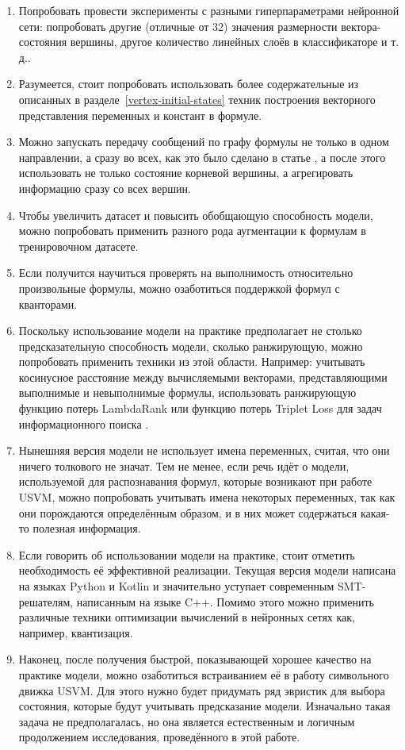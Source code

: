 \begin{enumerate}
    \item Попробовать провести эксперименты с разными гиперпараметрами нейронной сети: попробовать другие (отличные от 32) значения размерности вектора-состояния вершины, другое количество линейных слоёв в классификаторе и т. д..
    \item Разумеется, стоит попробовать использовать более содержательные из описанных в разделе~\ref{vertex-initial-states} техник построения векторного представления переменных и констант в формуле.
    \item Можно запускать передачу сообщений по графу формулы не только в одном направлении, а сразу во всех, как это было сделано в статье \cite{gnn-for-scheduling-paper}, а после этого использовать не только состояние корневой вершины, а агрегировать информацию сразу со всех вершин.
    \item Чтобы увеличить датасет и повысить обобщающую способность модели, можно попробовать применить разного рода аугментации к формулам в тренировочном датасете.
    \item Если получится научиться проверять на выполнимость относительно произвольные формулы, можно озаботиться поддержкой формул с кванторами.
    \item Поскольку использование модели на практике предполагает не столько предсказательную способность модели, сколько ранжирующую, можно попробовать применить техники из этой области. Например: учитывать косинусное расстояние между вычисляемыми векторами, представляющими выполнимые и невыполнимые формулы, использовать ранжирующую функцию потерь LambdaRank \cite{lambda-rank-paper} или функцию потерь Triplet Loss для задач информационного поиска \cite{triplet-loss-paper-1} \cite{triplet-loss-paper-2}.
    \item Нынешняя версия модели не использует имена переменных, считая, что они ничего толкового не значат. Тем не менее, если речь идёт о модели, используемой для распознавания формул, которые возникают при работе USVM, можно попробовать учитывать имена некоторых переменных, так как они порождаются определённым образом, и в них может содержаться какая-то полезная информация.
    \item Если говорить об использовании модели на практике, стоит отметить необходимость её эффективной реализации. Текущая версия модели написана на языках Python и Kotlin и значительно уступает современным SMT-решателям, написанным на языке C++. Помимо этого можно применить различные техники оптимизации вычислений в нейронных сетях как, например, квантизация.
    \item Наконец, после получения быстрой, показывающей хорошее качество на практике модели, можно озаботиться встраиванием её в работу символьного движка USVM. Для этого нужно будет придумать ряд эвристик для выбора состояния, которые будут учитывать предсказание модели. Изначально такая задача не предполагалась, но она является естественным и логичным продолжением исследования, проведённого в этой работе.
\end{enumerate}


